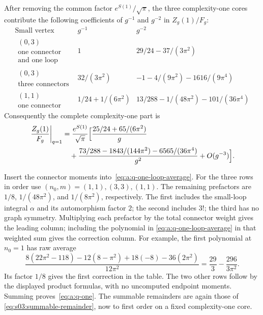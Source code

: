 \begin{prp}\label{prp:a:q-one}
After removing the common factor $e^{S(1)}/\sqrt\pi$, the three
complexity-one cores contribute the following coefficients of
$g^{-1}$ and $g^{-2}$ in $Z_g(1)/F_g$:
\begin{equation}\label{eq:a:q-one-table}
\begin{array}{c|c|c}
 \text{Small vertex}&g^{-1}&g^{-2}\\\hline
 \begin{gathered}(0,3)\\\text{one connector}\\\text{and one loop}\end{gathered}
 &1&29/24-37/(3\pi^2)\\
 \begin{gathered}(0,3)\\\text{three connectors}\end{gathered}
 &32/(3\pi^2)&-1-4/(9\pi^2)-1616/(9\pi^4)\\
 \begin{gathered}(1,1)\\\text{one connector}\end{gathered}
 &1/24+1/(6\pi^2)&13/288-1/(48\pi^2)-101/(36\pi^4)
\end{array}
\end{equation}
Consequently the complete complexity-one part is
\begin{equation}\label{eq:a:q-one}
\begin{aligned}
 \left.\frac{Z_g(1)}{F_g}\right|_{q=1}
 &=\frac{e^{S(1)}}{\sqrt\pi}\Bigl[
   \frac{25/24+65/(6\pi^2)}g\\
 &\quad+\frac{73/288-1843/(144\pi^2)-6565/(36\pi^4)}{g^2}
   +O(g^{-3})\Bigr].
\end{aligned}
\end{equation}
\end{prp}
\begin{prf}
Insert the connector moments into~\eqref{eq:a:q-one-loop-average}.
For the three rows in order use $(n_0,m)=(1,1),(3,3),(1,1)$.
The remaining prefactors are $1/8$, $1/(48\pi^2)$, and
$1/(8\pi^2)$, respectively. The first includes the small-loop integral
$\alpha$ and its automorphism factor $2$; the second includes $3!$;
the third has no graph symmetry.
Multiplying each prefactor by the total connector weight gives the
leading column; including the polynomial in
\eqref{eq:a:q-one-loop-average} in that weighted sum gives the
correction column.
For example, the first polynomial at $n_0=1$ has raw average
\[
 \frac{8(22\pi^2-118)-12(8-\pi^2)+18(-8)
                   -36(2\pi^2)}{12\pi^2}
 =\frac{29}{3}-\frac{296}{3\pi^2}.
\]
Its factor $1/8$ gives the first correction in the table. The two
other rows follow by the displayed product formulas, with no
uncomputed endpoint moments. Summing proves~\eqref{eq:a:q-one}.
The summable remainders are again those of
\eqref{eq:s03:summable-remainder}, now to first order on a fixed
complexity-one core.
\end{prf}

